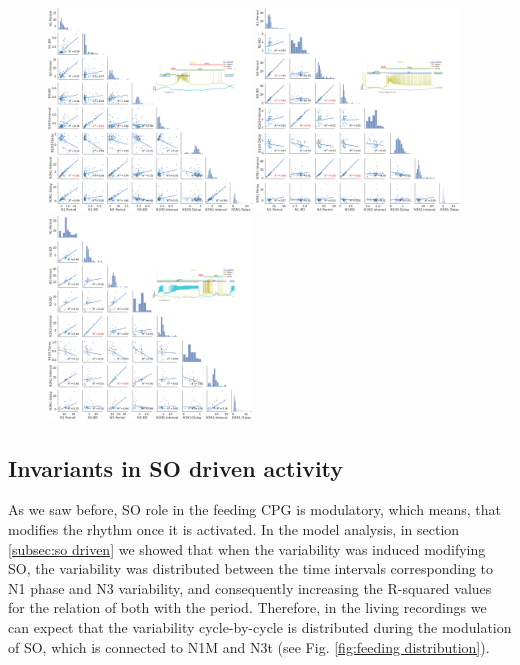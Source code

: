 \begin{figure}[htbp]
	\centering
	\includegraphics[width=0.48\textwidth]{./invariants/data/SUSSEX/prep1/images/2phases/panel_with_pairplot.pdf}
	\includegraphics[width=0.48\textwidth]{./invariants/data/SUSSEX/prep2/images/2phases/panel_with_pairplot.pdf}
	\includegraphics[width=0.48\textwidth]{./invariants/data/SUSSEX/prep3/images/2phases/panel_with_pairplot.pdf}
	\caption{}
	\label{fig:spontaneous pairplot comparison}
\end{figure}


\clearpage
\newpage
\subsection{Invariants in SO driven activity}
As we saw before, SO role in the feeding CPG is modulatory, which means, that modifies the rhythm once it is activated. In the model analysis, in section \ref{subsec:so driven} we showed that when the variability was induced modifying SO, the variability was distributed between the time intervals corresponding to N1 phase and N3 variability, and consequently increasing the R-squared values for the relation of both with the period. Therefore, in the living recordings we can expect that the variability cycle-by-cycle is distributed during the modulation of SO, which is connected to N1M and N3t (see Fig. \ref{fig:feeding distribution}). 

